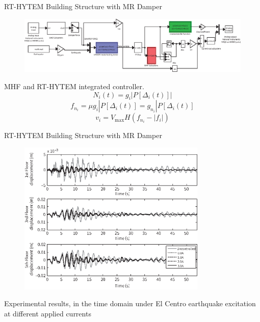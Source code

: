\documentclass[usepdftitle=false]{beamer}
\begin{document}
\begin{frame}{RT-HYTEM Building Structure with MR Damper}
\begin{figure}[H]
\centering
\includegraphics[width=1\textwidth] {figure/8-15.eps}
\label{fig:8-15}
\end{figure}
MHF and RT-HYTEM integrated controller.
\begin{equation}\label{eq:8-22}
N_{i}(t)=g_{i}|P\left[\Delta_{i}(t)\right]|
\end{equation}
\begin{equation}\label{eq:8-23}
f_{n_{i}}=\mu g_{i}|P\left[\Delta_{i}(t)\right]=g_{n_{i}}|P\left[\Delta_{i}(t)\right]
\end{equation}
\begin{equation}\label{eq:8-24}
v_{i} = V_{\text{max}}H\left(f_{n_{i}}-|f_{i}|\right)
\end{equation}
\end{frame}

\begin{frame}{RT-HYTEM Building Structure with MR Damper}
\begin{figure}[H]
\centering
\includegraphics[width=0.8\textwidth] {figure/8-16.eps}
\label{fig:8-16}
\end{figure}
Experimental results, in the time domain under El Centro earthquake excitation at different applied currents
\end{frame}
\end{document}
